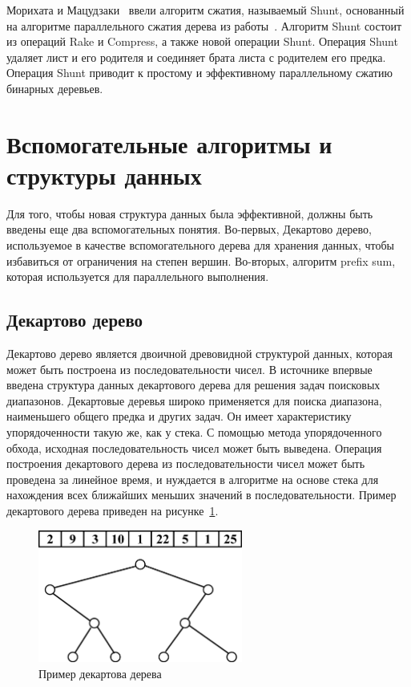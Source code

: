 \documentclass[specification,annotation]{itmo-student-thesis}
\begin{document}
Морихата и Мацудзаки~\cite{morihata08} ввели алгоритм сжатия, называемый Shunt, основанный на алгоритме параллельного сжатия дерева из 
работы~\cite{miller85}. Алгоритм Shunt состоит из операций Rake и Compress, а также новой операции Shunt. Операция Shunt удаляет лист и его родителя и 
соединяет брата листа с родителем его предка. Операция Shunt приводит к простому и эффективному параллельному сжатию бинарных деревьев.

\section{Вспомогательные алгоритмы и структуры данных}\label{survey-misc}


Для того, чтобы новая структура данных была эффективной, должны быть введены еще два вспомогательных понятия. Во-первых, Декартово дерево, используемое в качестве вспомогательного дерева для хранения данных, чтобы избавиться от ограничения на степен вершин. Во-вторых, алгоритм prefix sum, которая используется для параллельного выполнения.


\subsection{Декартово дерево}


Декартово дерево является двоичной древовидной структурой данных, которая может быть построена из последовательности чисел. В источнике \cite{cartesian-tree} впервые введена структура данных декартового дерева для решения задач поисковых диапазонов. Декартовые деревья широко применяется для поиска диапазона, наименьшего общего предка и других задач. Он имеет характеристику упорядоченности такую же, как у стека. С помощью метода упорядоченного обхода, исходная последовательность чисел может быть выведена. Операция построения декартового дерева из последовательности чисел может быть проведена за линейное время, и нуждается в алгоритме на основе стека для нахождения всех ближайших меньших значений в последовательности. Пример декартового дерева приведен на рисунке~\ref{fig:cartesian-idea}.


\begin{figure}[!ht]
\centering
\includegraphics[width=0.6\textwidth]{pic/cartesian-tree-idea.png}
\caption{Пример декартова дерева}\label{fig:cartesian-idea}
\end{figure}
\end{document}
